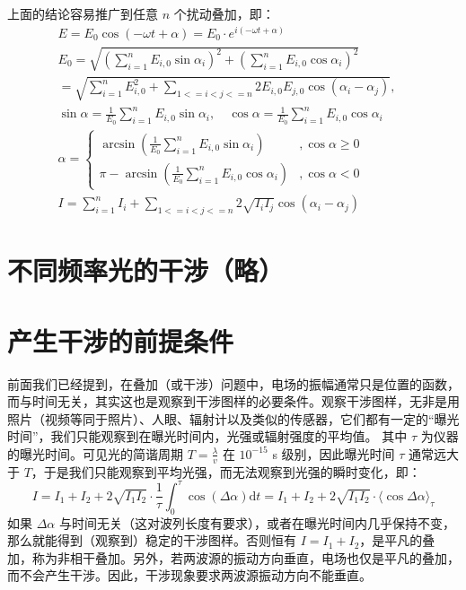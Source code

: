 \documentclass[UTF8]{report}
\theoremstyle{MyLineTheoremStyle} %
\theoremstyle{MyBlockTheoremStyle} %
\theoremstyle{MySubsubsectionStyle} %
\begin{document}
上面的结论容易推广到任意 $n$ 个扰动叠加，即：
\begin{gather}
    E = E_0 \cos \left(-\omega t + \alpha \right) = E_0 \cdot e^{i(-\omega t + \alpha)}
    \\ 
    E_0 = \sqrt{\left( \sum_{i=1}^n E_{i,0}\sin \alpha_i \right)^2 + \left( \sum_{i=1}^n E_{i,0}\cos \alpha_i \right)^2 }   \\ 
    =  \sqrt{\sum_{i=1}^n E_{i,0}^2 + \sum_{1 <= i < j <= n} 2E_{i,0}E_{j,0}\cos(\alpha_i - \alpha_j)},\quad
    \\ 
    \sin \alpha = \frac{1}{E_0}\sum_{i=1}^n E_{i,0}\sin \alpha_i ,\quad 
    \cos \alpha = \frac{1}{E_0}\sum_{i=1}^n E_{i,0}\cos \alpha_i \\ 
    \alpha = 
    \begin{cases}
        \arcsin \left( \frac{1}{E_0}\sum_{i=1}^n E_{i,0}\sin \alpha_i  \right) &, \cos \alpha \geqslant 0 \\
        \pi - \arcsin \left( \frac{1}{E_0}\sum_{i=1}^n E_{i,0}\cos \alpha_i  \right) &,  \cos \alpha < 0
    \end{cases} \\ 
    I = \sum_{i=1}^n I_i + \sum_{1 <= i < j <= n} 2\sqrt{I_iI_j} \cos(\alpha_i - \alpha_j) 
\end{gather}

\section{不同频率光的干涉（略）}

\section{产生干涉的前提条件}\label{产生干涉的前提条件}

前面我们已经提到，在叠加（或干涉）问题中，电场的振幅通常只是位置的函数，而与时间无关，其实这也是观察到干涉图样的必要条件。观察干涉图样，无非是用照片（视频等同于照片）、人眼、辐射计以及类似的传感器，它们都有一定的“曝光时间”，我们只能观察到在曝光时间内，光强或辐射强度的平均值。
其中 $\tau$ 为仪器的曝光时间。可见光的简谐周期 $T = \frac{\lambda}{v}$ 在 $10^{-15}$ s 级别，因此曝光时间 $\tau$ 通常远大于 $T$，于是我们只能观察到平均光强，而无法观察到光强的瞬时变化，即：
\begin{equation}
I = I_1 + I_2 + 2 \sqrt{I_1 I_2} \cdot \frac{1}{\tau} \int_{0}^{\tau}  \cos(\Delta \alpha) \mathrm{d} t =  I_1 + I_2 + 2 \sqrt{I_1 I_2} \cdot \langle \cos \Delta \alpha \rangle_\tau
\end{equation}
如果 $\Delta \alpha$ 与时间无关（这对波列长度有要求），或者在曝光时间内几乎保持不变，那么就能得到（观察到）稳定的干涉图样。否则恒有 $I = I_1 + I_2$，是平凡的叠加，称为非相干叠加。另外，若两波源的振动方向垂直，电场也仅是平凡的叠加，而不会产生干涉。因此，干涉现象要求两波源振动方向不能垂直。
\end{document}
